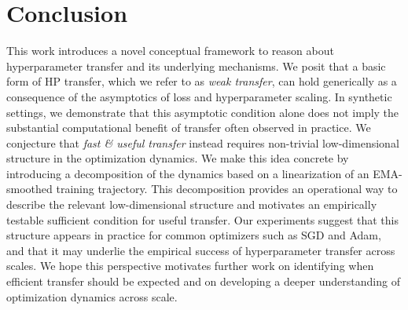 \vspace{-1mm}
\section{Conclusion}
\vspace{-1mm}
This work introduces a novel conceptual framework to reason about hyperparameter transfer and its underlying mechanisms. We posit that a basic form of HP transfer, which we refer to as \emph{weak transfer}, can hold generically as a consequence of the asymptotics of loss and hyperparameter scaling. In synthetic settings, we demonstrate that this asymptotic condition alone does not imply the substantial computational benefit of transfer often observed in practice. We conjecture that \emph{fast \& useful transfer} instead requires non-trivial low-dimensional structure in the optimization dynamics. We make this idea concrete by introducing a decomposition of the dynamics based on a linearization of an EMA-smoothed training trajectory. This decomposition provides an operational way to describe the relevant low-dimensional structure and motivates an empirically testable sufficient condition for useful transfer. Our experiments suggest that this structure appears in practice for common optimizers such as SGD and Adam, and that it may underlie the empirical success of hyperparameter transfer across scales. We hope this perspective motivates further work on identifying when efficient transfer should be expected and on developing a deeper understanding of optimization dynamics across scale.